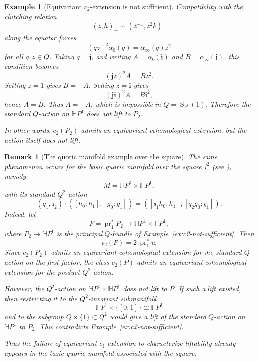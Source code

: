 \documentclass[11pt,a4paper]{article}
\numberwithin{equation}{section}
\newtheorem{remark}[definition]{Remark}
\newtheorem{example}[definition]{Example}
\theoremstyle{named}
\begin{document}
\begin{example}[Equivariant \(c_2\)-extension is not sufficient]
Compatibility with the clutching relation
\[
(z,h)_+\sim(z^{-1},z^2h)_-
\]
along the equator forces
\[
(qz)^2\alpha_0(q)=\alpha_\infty(q)z^2
\]
for all \(q,z\in Q\). Taking \(q=\mathbf j\), and writing \(A=\alpha_0(\mathbf j)\) and \(B=\alpha_\infty(\mathbf j)\), this condition becomes
\[
(\mathbf j z)^2A=Bz^2.
\]
Setting \(z=1\) gives \(B=-A\). Setting \(z=\mathbf i\) gives
\[
(\mathbf j\mathbf i)^2A=B\mathbf i^2,
\]
 hence \(A=B\). Thus \(A=-A\), which is impossible in \(Q=\operatorname{Sp}(1)\). Therefore the standard \(Q\)-action on \(\mathbb H P^1\) does not lift to \(P_2\).

\noindent In other words, \(c_2(P_2)\) admits an equivariant cohomological extension, but the action itself does not lift.
\end{example}

\begin{remark}[The quoric manifold example over the square]
\label{rem:square-quoric-c2-not-sufficient}
The same phenomenon occurs for the basic quoric manifold over the square \(I^2\) (see \cite[Example 4.3.4(2)]{ho}), namely
\[
M=\mathbb H P^1\times \mathbb H P^1,
\]
with its standard \(Q^2\)-action
\[
(q_1,q_2)\cdot([h_0:h_1],[g_0:g_1])
=
([q_1h_0:h_1],[q_2g_0:g_1]).
\]
Indeed, let
\[
P=\operatorname{pr}_1^*P_2\longrightarrow
\mathbb H P^1\times \mathbb H P^1,
\]
where \(P_2\to \mathbb H P^1\) is the principal \(Q\)-bundle of
Example~\ref{ex:c2-not-sufficient}. Then
\[
c_2(P)=2\,\operatorname{pr}_1^*u.
\]
Since \(c_2(P_2)\) admits an equivariant cohomological extension for the standard \(Q\)-action on the first factor, the class \(c_2(P)\) admits an equivariant cohomological extension for the product \(Q^2\)-action.

However, the \(Q^2\)-action on \(\mathbb H P^1\times \mathbb H P^1 \) does not lift to \(P\). If such a lift existed, then restricting it to the \(Q^2\)-invariant submanifold
\[
\mathbb H P^1\times\{[0:1]\}\cong \mathbb H P^1
\]
and to the subgroup \(Q\times\{1\}\subset Q^2\) would give a lift of the standard \(Q\)-action on \(\mathbb H P^1\) to \(P_2\). This contradicts Example~\ref{ex:c2-not-sufficient}.

Thus the failure of equivariant \(c_2\)-extension to characterize liftability already appears in the basic quoric manifold associated with the square.
\end{remark}
\end{document}
